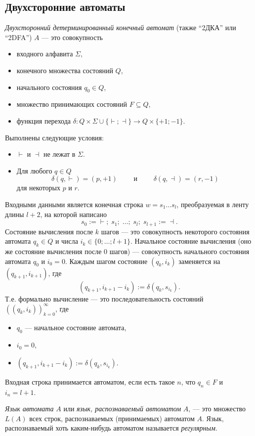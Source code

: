 \documentclass[12pt,a4paper]{article}
\begin{document}
    \subsection{Двухсторонние автоматы}

    \begin{definition}
        \emph{Двухсторонний детерминированный конечный автомат} (также ``2ДКА'' или ``2DFA'') $A$ --- это совокупность
        \begin{itemize}
            \item входного алфавита $\Sigma$,
            \item конечного множества состояний $Q$,
            \item начального состояния $q_0 \in Q$,
            \item множество принимающих состояний $F \subseteq Q$,
            \item функция перехода $\delta: Q \times \Sigma \cup \{\vdash; \dashv\} \to Q \times \{+1; -1\}$.
        \end{itemize}
        Выполнены следующие условия:
        \begin{itemize}
            \item $\vdash$ и $\dashv$ не лежат в $\Sigma$.
            \item Для любого $q \in Q$
                \[\delta(q, \vdash) = (p, +1) \qquad \text{ и } \qquad \delta(q, \dashv) = (r, -1)\]
                для некоторых $p$ и $r$.
        \end{itemize}
        Входными данными является конечная строка $w = s_1 \dots s_l$, преобразуемая в ленту длины $l+2$, на которой написано
        \[s_0 := \vdash;\; s_1;\; \dots;\; s_l;\; s_{l+1} := \dashv.\]
        Состояние вычисления после $k$ шагов --- это совокупность некоторого состояния автомата $q_k \in Q$ и числа $i_k \in \{0; \dots; l+1\}$. Начальное состояние вычисления (оно же состояние вычисления после $0$ шагов) --- совокупность начального состояния автомата $q_0$ и $i_0 = 0$. Каждым шагом состояние $(q_k, i_k)$ заменяется на $(q_{k+1}, i_{k+1})$, где
        \[(q_{k+1}, i_{k+1} - i_k) := \delta(q_k, s_{i_k}).\]
        Т.е. формально вычисление --- это последовательность состояний $((q_k, i_k))_{k=0}^\infty$, где
        \begin{itemize}
            \item $q_0$ --- начальное состояние автомата,
            \item $i_0 = 0$,
            \item $(q_{k+1}, i_{k+1} - i_k) := \delta(q_k, s_{i_k})$.
        \end{itemize}
        Входная строка принимается автоматом, если есть такое $n$, что $q_n \in F$ и $i_n = l+1$.

        \emph{Язык автомата} $A$ или \emph{язык, распознаваемый автоматом} $A$, --- это множество $L(A)$ всех строк, распознаваемых (принимаемых) автоматом $A$. Язык, распознаваемый хоть каким-нибудь автоматом называется \emph{регулярным}.
    \end{definition}
\end{document}
